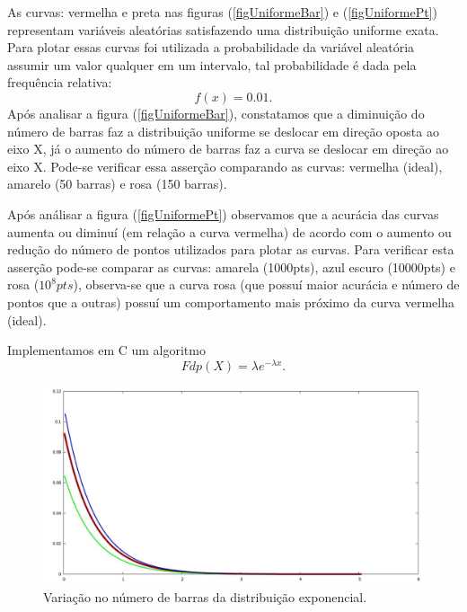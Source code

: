 As curvas: vermelha e preta nas figuras (\ref{figUniformeBar}) e (\ref{figUniformePt}) representam variáveis aleatórias satisfazendo uma distribuição uniforme exata. Para plotar essas curvas foi utilizada a probabilidade da variável aleatória assumir um valor qualquer em um intervalo, tal probabilidade é dada pela frequência relativa:
\begin{equation}
f(x) = 0.01.
\end{equation}
Após analisar a figura (\ref{figUniformeBar}), constatamos que a diminuição do número de barras faz a distribuição uniforme se deslocar em direção oposta ao eixo X, já o aumento do número de barras  faz a curva se deslocar em direção ao eixo X. Pode-se verificar essa asserção comparando as curvas: vermelha (ideal), amarelo (50 barras) e rosa (150 barras).

Após análisar a figura (\ref{figUniformePt}) observamos que a acurácia das curvas aumenta ou diminuí (em relação a curva vermelha) de acordo com o aumento ou redução do número de pontos utilizados para plotar as curvas. Para verificar esta asserção pode-se comparar as curvas: amarela (1000pts), azul escuro (10000pts) e rosa ($10^{8} pts$), observa-se que a curva rosa (que possuí maior acurácia e número de pontos que a outras) possuí um comportamento mais próximo da curva vermelha (ideal).

Implementamos em C um algoritmo %
\begin{equation}
Fdp(X) = \lambda e^{-\lambda x}.
\end{equation}

\begin{figure}[!htb]
\centering
\begin{minipage}[b]{0.9\linewidth}
\includegraphics[width=\linewidth]{./img/Distribuicoes/expVarBarr.jpg}
\caption{Variação no número de barras da distribuição exponencial.}
\label{figExpBar}
\end{minipage} \hfill
\end{figure}

